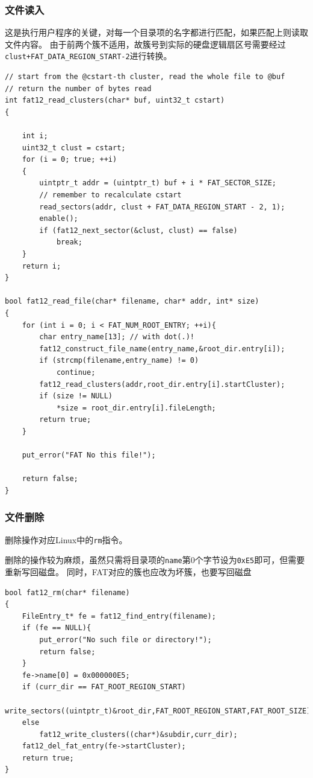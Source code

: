 \documentclass[logo,reportComp]{thesis}
\begin{document}
\subsubsection{文件读入}
这是执行用户程序的关键，对每一个目录项的名字都进行匹配，如果匹配上则读取文件内容。
由于前两个簇不适用，故簇号到实际的硬盘逻辑扇区号需要经过\verb'clust+FAT_DATA_REGION_START-2'进行转换。
\begin{lstlisting}
// start from the @cstart-th cluster, read the whole file to @buf
// return the number of bytes read
int fat12_read_clusters(char* buf, uint32_t cstart)
{

	int i;
	uint32_t clust = cstart;
	for (i = 0; true; ++i)
	{
		uintptr_t addr = (uintptr_t) buf + i * FAT_SECTOR_SIZE;
		// remember to recalculate cstart
		read_sectors(addr, clust + FAT_DATA_REGION_START - 2, 1);
		enable();
		if (fat12_next_sector(&clust, clust) == false)
			break;
	}
	return i;
}

bool fat12_read_file(char* filename, char* addr, int* size)
{
	for (int i = 0; i < FAT_NUM_ROOT_ENTRY; ++i){
		char entry_name[13]; // with dot(.)!
		fat12_construct_file_name(entry_name,&root_dir.entry[i]);
		if (strcmp(filename,entry_name) != 0)
			continue;
		fat12_read_clusters(addr,root_dir.entry[i].startCluster);
		if (size != NULL)
			*size = root_dir.entry[i].fileLength;
		return true;
	}

	put_error("FAT No this file!");

	return false;
}
\end{lstlisting}

\subsubsection{文件删除}
删除操作对应Linux中的\verb'rm'指令。

删除的操作较为麻烦，虽然只需将目录项的\verb'name'第0个字节设为\verb'0xE5'即可，但需要重新写回磁盘。
同时，FAT对应的簇也应改为坏簇，也要写回磁盘
\begin{lstlisting}
bool fat12_rm(char* filename)
{
	FileEntry_t* fe = fat12_find_entry(filename);
	if (fe == NULL){
		put_error("No such file or directory!");
		return false;
	}
	fe->name[0] = 0x000000E5;
	if (curr_dir == FAT_ROOT_REGION_START)
		write_sectors((uintptr_t)&root_dir,FAT_ROOT_REGION_START,FAT_ROOT_SIZE);
	else
		fat12_write_clusters((char*)&subdir,curr_dir);
	fat12_del_fat_entry(fe->startCluster);
	return true;
}
\end{lstlisting}
\end{document}
